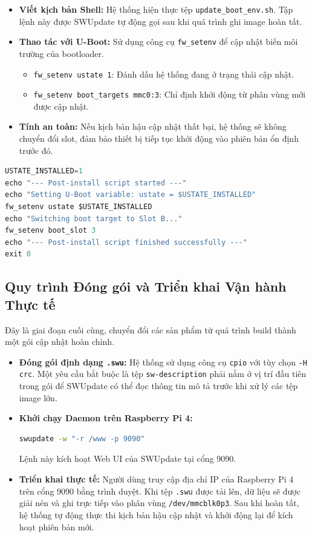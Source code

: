\begin{itemize}
    \item \textbf{Viết kịch bản Shell:} Hệ thống hiện thực tệp \texttt{update\_boot\_env.sh}. Tập lệnh này được SWUpdate tự động gọi sau khi quá trình ghi image hoàn tất.

    \item \textbf{Thao tác với U-Boot:} Sử dụng công cụ \texttt{fw\_setenv} để cập nhật biến môi trường của bootloader.
    \begin{itemize}
        \item \texttt{fw\_setenv ustate 1}: Đánh dấu hệ thống đang ở trạng thái cập nhật.
        \item \texttt{fw\_setenv boot\_targets mmc0:3}: Chỉ định khởi động từ phân vùng mới được cập nhật.
    \end{itemize}

    \item \textbf{Tính an toàn:} Nếu kịch bản hậu cập nhật thất bại, hệ thống sẽ không chuyển đổi slot, đảm bảo thiết bị tiếp tục khởi động vào phiên bản ổn định trước đó.
\end{itemize}

\begin{lstlisting}[style=thesisstyle, language=Python]
USTATE_INSTALLED=1
echo "--- Post-install script started ---"
echo "Setting U-Boot variable: ustate = $USTATE_INSTALLED"
fw_setenv ustate $USTATE_INSTALLED
echo "Switching boot target to Slot B..."
fw_setenv boot_slot 3
echo "--- Post-install script finished successfully ---"
exit 0
\end{lstlisting}
\subsection{Quy trình Đóng gói và Triển khai Vận hành Thực tế}

Đây là giai đoạn cuối cùng, chuyển đổi các sản phẩm từ quá trình build thành một gói cập nhật hoàn chỉnh.

\begin{itemize}
    \item \textbf{Đóng gói định dạng \texttt{.swu}:} Hệ thống sử dụng công cụ \texttt{cpio} với tùy chọn \texttt{-H crc}. Một yêu cầu bắt buộc là tệp \texttt{sw-description} phải nằm ở vị trí đầu tiên trong gói để SWUpdate có thể đọc thông tin mô tả trước khi xử lý các tệp image lớn.

    \item \textbf{Khởi chạy Daemon trên Raspberry Pi 4:}
\begin{lstlisting}[style=thesisstyle, language=bash]
swupdate -w "-r /www -p 9090"
\end{lstlisting}
    Lệnh này kích hoạt Web UI của SWUpdate tại cổng 9090.

    \item \textbf{Triển khai thực tế:} Người dùng truy cập địa chỉ IP của Raspberry Pi 4 trên cổng 9090 bằng trình duyệt. Khi tệp \texttt{.swu} được tải lên, dữ liệu sẽ được giải nén và ghi trực tiếp vào phân vùng \texttt{/dev/mmcblk0p3}. Sau khi hoàn tất, hệ thống tự động thực thi kịch bản hậu cập nhật và khởi động lại để kích hoạt phiên bản mới.
\end{itemize}

